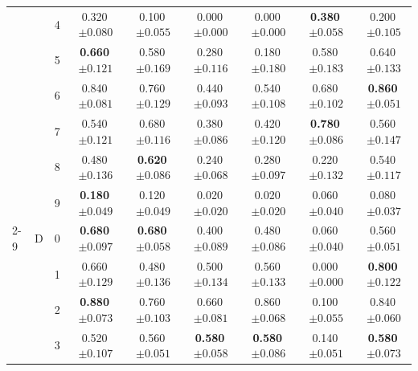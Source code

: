 \begin{longtable}{lllcccccc}
 &  & 4 & 0.320$\,{\scriptstyle\pm0.080}$ & 0.100$\,{\scriptstyle\pm0.055}$ & 0.000$\,{\scriptstyle\pm0.000}$ & 0.000$\,{\scriptstyle\pm0.000}$ & \textbf{0.380}$\,{\scriptstyle\pm0.058}$ & 0.200$\,{\scriptstyle\pm0.105}$ \\
 &  & 5 & \textbf{0.660}$\,{\scriptstyle\pm0.121}$ & 0.580$\,{\scriptstyle\pm0.169}$ & 0.280$\,{\scriptstyle\pm0.116}$ & 0.180$\,{\scriptstyle\pm0.180}$ & 0.580$\,{\scriptstyle\pm0.183}$ & 0.640$\,{\scriptstyle\pm0.133}$ \\
 &  & 6 & 0.840$\,{\scriptstyle\pm0.081}$ & 0.760$\,{\scriptstyle\pm0.129}$ & 0.440$\,{\scriptstyle\pm0.093}$ & 0.540$\,{\scriptstyle\pm0.108}$ & 0.680$\,{\scriptstyle\pm0.102}$ & \textbf{0.860}$\,{\scriptstyle\pm0.051}$ \\
 &  & 7 & 0.540$\,{\scriptstyle\pm0.121}$ & 0.680$\,{\scriptstyle\pm0.116}$ & 0.380$\,{\scriptstyle\pm0.086}$ & 0.420$\,{\scriptstyle\pm0.120}$ & \textbf{0.780}$\,{\scriptstyle\pm0.086}$ & 0.560$\,{\scriptstyle\pm0.147}$ \\
 &  & 8 & 0.480$\,{\scriptstyle\pm0.136}$ & \textbf{0.620}$\,{\scriptstyle\pm0.086}$ & 0.240$\,{\scriptstyle\pm0.068}$ & 0.280$\,{\scriptstyle\pm0.097}$ & 0.220$\,{\scriptstyle\pm0.132}$ & 0.540$\,{\scriptstyle\pm0.117}$ \\
 &  & 9 & \textbf{0.180}$\,{\scriptstyle\pm0.049}$ & 0.120$\,{\scriptstyle\pm0.049}$ & 0.020$\,{\scriptstyle\pm0.020}$ & 0.020$\,{\scriptstyle\pm0.020}$ & 0.060$\,{\scriptstyle\pm0.040}$ & 0.080$\,{\scriptstyle\pm0.037}$ \\
\cmidrule(lr){2-9}
 & D & 0 & \textbf{0.680}$\,{\scriptstyle\pm0.097}$ & \textbf{0.680}$\,{\scriptstyle\pm0.058}$ & 0.400$\,{\scriptstyle\pm0.089}$ & 0.480$\,{\scriptstyle\pm0.086}$ & 0.060$\,{\scriptstyle\pm0.040}$ & 0.560$\,{\scriptstyle\pm0.051}$ \\
 &  & 1 & 0.660$\,{\scriptstyle\pm0.129}$ & 0.480$\,{\scriptstyle\pm0.136}$ & 0.500$\,{\scriptstyle\pm0.134}$ & 0.560$\,{\scriptstyle\pm0.133}$ & 0.000$\,{\scriptstyle\pm0.000}$ & \textbf{0.800}$\,{\scriptstyle\pm0.122}$ \\
 &  & 2 & \textbf{0.880}$\,{\scriptstyle\pm0.073}$ & 0.760$\,{\scriptstyle\pm0.103}$ & 0.660$\,{\scriptstyle\pm0.081}$ & 0.860$\,{\scriptstyle\pm0.068}$ & 0.100$\,{\scriptstyle\pm0.055}$ & 0.840$\,{\scriptstyle\pm0.060}$ \\
 &  & 3 & 0.520$\,{\scriptstyle\pm0.107}$ & 0.560$\,{\scriptstyle\pm0.051}$ & \textbf{0.580}$\,{\scriptstyle\pm0.058}$ & \textbf{0.580}$\,{\scriptstyle\pm0.086}$ & 0.140$\,{\scriptstyle\pm0.051}$ & \textbf{0.580}$\,{\scriptstyle\pm0.073}$ \\

\end{longtable}
